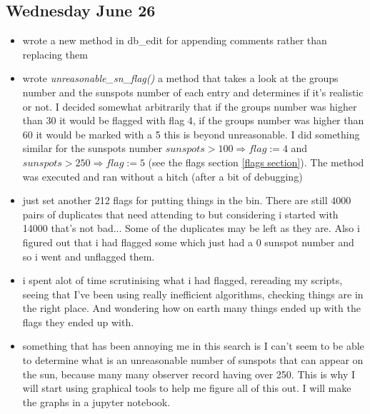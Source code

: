\documentclass[12pt]{article}
\begin{document}
\subsection{Wednesday June 26}
\begin{itemize}
    \item wrote a new method in db\_edit for appending comments rather than replacing them
    \item wrote \textit{unreasonable\_sn\_flag()} a method that takes a look at the groups number and the sunspots number of each entry and determines if it's realistic or not. I decided somewhat arbitrarily that if the groups number was higher than 30 it would be flagged with flag 4, if the groups number was higher than 60 it would be marked with a 5 this is beyond unreasonable. I did something similar for the sunspots number $sunspots>100\Rightarrow flag:=4$ and $sunspots>250\Rightarrow flag:=5$ (see the flags section \ref{flags section}). The method was executed and ran without a hitch (after a bit of debugging)
    \item just set another 212 flags for putting things in the bin. There are still 4000 pairs of duplicates that need attending to but considering i started with 14000 that's not bad... Some of the duplicates may be left as they are. Also i figured out that i had flagged some which just had a 0 sunspot number and so i went and unflagged them.
    \item i spent alot of time scrutinising what i had flagged, rereading my scripts, seeing that I've been using really inefficient algorithms, checking things are in the right place. And wondering how on earth many things ended up with the flags they ended up with.
    \item something that has been annoying me in this search is I can't seem to be able to determine what is an unreasonable number of sunspots that can appear on the sun, because many many observer record having over 250. This is why I will start using graphical tools to help me figure all of this out. I will make the graphs in a jupyter notebook.
\end{itemize}
    
\end{document}
